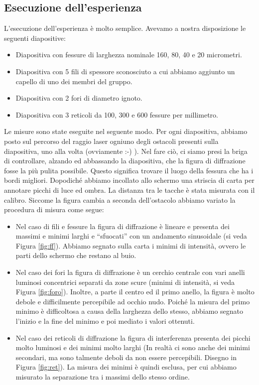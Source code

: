 \subsection{Esecuzione dell'esperienza}

L'esecuzione dell'esperienza è molto semplice. Avevamo a nostra disposizione le seguenti diapositive:

\begin{itemize}
    \item{Diapositiva con fessure di larghezza nominale 160, 80, 40 e 20 micrometri.}
    \item{Diapositiva con 5 fili di spessore sconosciuto a cui abbiamo aggiunto un capello di uno dei membri del gruppo.}
    \item{Diapositiva con 2 fori di diametro ignoto.}
    \item{Diapositiva con 3 reticoli da 100, 300 e 600 fessure per millimetro.}
\end{itemize}

Le misure sono state eseguite nel seguente modo. Per ogni diapositiva, abbiamo posto sul percorso del raggio laser ogniuno degli ostacoli
presenti sulla diapositiva, uno alla volta (ovviamente :-) ). Nel fare ciò, ci siamo presi la briga di controllare, alzando ed abbassando
la diapositiva, che la figura di diffrazione fosse la più pulita possibile. Questo significa trovare il luogo della fessura che ha i bordi
migliori. Dopodiché abbiamo incollato allo schermo una striscia di carta per annotare picchi di luce ed ombra. La distanza tra le tacche
è stata misurata con il calibro. Siccome la figura cambia a seconda dell'ostacolo abbiamo variato la procedura di misura come segue:

\begin{itemize}
    \item{Nel caso di fili e fessure la figura di diffrazione è lineare e presenta dei massimi e minimi larghi e ``sfuocati'' con un andamento
        sinusoidale (si veda Figura \ref{fig:ff}). Abbiamo segnato sulla carta i minimi di intensità, ovvero le parti dello schermo
        che restano al buio.}
    \item{Nel caso dei fori la figura di diffrazione è un cerchio centrale con vari anelli luminosi concentrici separati da
        zone scure (minimi di intensità, si veda Figura \ref{fig:foro}). Inoltre, a parte il centro ed il primo anello,
        la figura è molto debole e difficilmente
        percepibile ad occhio nudo. Poiché la misura del primo minimo è difficoltosa a causa della larghezza dello stesso, abbiamo segnato
        l'inizio e la fine del minimo e poi mediato i valori ottenuti.}
    \item{Nel caso dei reticoli di diffrazione la figura di interferenza presenta dei picchi molto luminosi e dei minimi molto larghi
            (In realtà ci sono anche dei minimi secondari, ma sono talmente deboli da non essere percepibili. Disegno in Figura \ref{fig:ret}).
            La misura dei minimi è quindi esclusa, per cui abbiamo misurato la separazione tra i massimi dello stesso ordine.}
\end{itemize}

